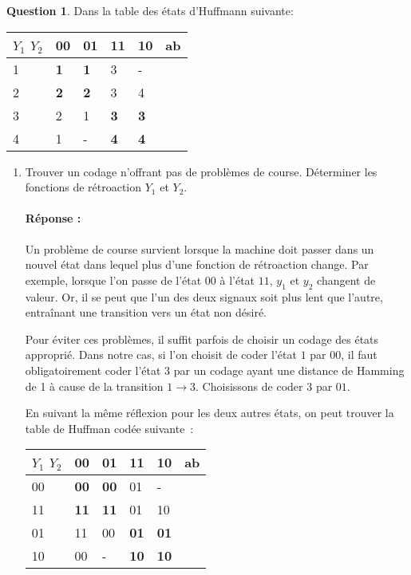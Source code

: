 \documentclass[11pt,a4paper,dvipsnames,]{article}
\theoremstyle{definition}%
\newtheorem{Q}{Question}[] %
\newcommand{\reponse}[1]{%
	\ifthenelse {\boolean{corrige}} {\paragraph{Réponse :} \color{darkblue}   #1\color{black}} {}
 }
\begin{document}
\begin{Q}
	Dans la table des états d'Huffmann suivante:
	\begin{center}
		\begin{tabular}{|l|l|l|l|l|l}
		\hline
		 $Y_1$ $Y_2$ & 00         & 01         & 11         & 10         & \multicolumn{1}{l|}{ab} \\ \hline
		1 & \textbf{1} & \textbf{1} & 3          & -          &    \\ \cline{1-5}
		2 & \textbf{2} & \textbf{2} & 3          & 4          &    \\ \cline{1-5}
		3 & 2          & 1          & \textbf{3} & \textbf{3} &    \\ \cline{1-5}
		4 & 1          & -          & \textbf{4} & \textbf{4} &    \\ \cline{1-5}
		\end{tabular}

	\end{center}

	\begin{enumerate}
		\item Trouver un codage n'offrant pas de problèmes de course. Déterminer les fonctions de
		rétroaction $Y_1$ et $Y_2$.

		\reponse{
			Un problème de course survient lorsque la machine doit passer dans un nouvel état dans lequel plus d'une fonction de rétroaction change.
			Par exemple, lorsque l'on passe de l'état $00$ à l'état $11$, $y_1$ et $y_2$ changent de valeur.
			Or, il se peut que l'un des deux signaux soit plus lent que l'autre, entraînant une transition vers un état non désiré.

			Pour éviter ces problèmes, il suffit parfois de choisir un codage des états approprié.
			Dans notre cas, si l'on choisit de coder l'état $1$ par $00$, il faut obligatoirement coder l'état $3$ par un codage ayant une distance de Hamming de 1 à cause de la transition $1 \rightarrow 3$.
			Choisissons de coder $3$ par $01$.

			En suivant la même réflexion pour les deux autres états, on peut trouver la table de Huffman codée suivante~:

			\begin{center}
				\begin{tabular}{|l|l|l|l|l|l}
				\hline
				 $Y_1$ $Y_2$ & 00         & 01         & 11         & 10         & \multicolumn{1}{l|}{ab} \\ \hline
				00 & \textbf{00} & \textbf{00} & 01          & -          &    \\ \cline{1-5}
				11 & \textbf{11} & \textbf{11} & 01          & 10          &    \\ \cline{1-5}
				01 & 11          & 00          & \textbf{01} & \textbf{01} &    \\ \cline{1-5}
				10 & 00         & -          & \textbf{10} & \textbf{10} &    \\ \cline{1-5}
				\end{tabular}
			\end{center}

}
\end{enumerate}
\end{Q}
\end{document}
